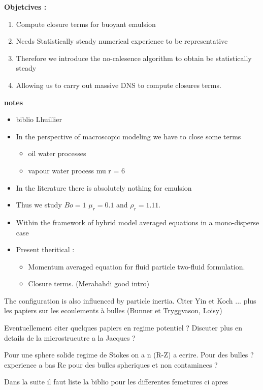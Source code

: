 \textbf{Objetcives : }

\begin{enumerate}
    \item Compute closure terms for buoyant emulsion
    \item Needs Statistically steady numerical experience to be representative 
    \item Therefore we introduce the no-calesence algorithm to obtain be statistically steady
    \item Allowing us to carry out massive DNS to compute closures terms. 
\end{enumerate}
\vspace*{1cm}
\textbf{notes}
\begin{itemize}
    \item biblio Lhuillier
    \item In the perspective of macroscopic modeling we have to close some terms 
    \begin{itemize}
        \item oil water processes
        \item vapour water process mu r = 6 
    \end{itemize}
    \item In the literature there is absolutely nothing for emulsion 
    \item Thus we study $Bo = 1$ $\mu_r = 0.1$ and $\rho_r = 1.11$. 
    \item Within the framework of hybrid model averaged equations in a mono-disperse case 
    \item Present theritical : 
     \begin{itemize}
        \item Momentum averaged equation for fluid particle two-fluid formulation. 
        \item Closure terms. (Merabahdi good intro)
    \end{itemize}
\end{itemize}

The configuration is also influenced by particle inertia. Citer Yin et Koch ... plus les papiers sur les ecoulements à bulles (Bunner et Tryggvason, Loisy)

Eventuellement citer quelques papiers en regime potentiel ? Discuter plus en details de la microstrucutre a la Jacques ?

Pour une sphere solide regime de Stokes on a n (R-Z) a ecrire. Pour des bulles ? experience a bas Re pour des bulles spheriques et non contaminees ?


Dans la suite il faut liste la biblio pour les differentes femetures ci apres







